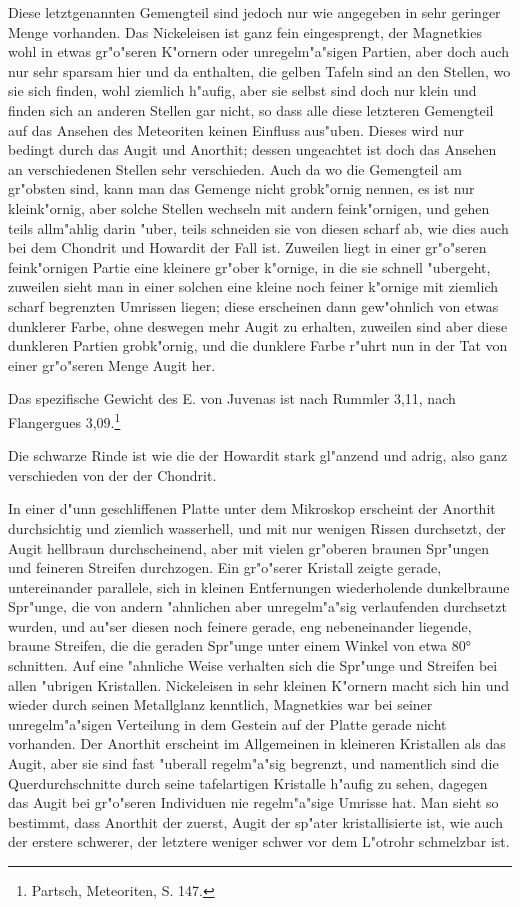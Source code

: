 \documentclass[a4paper, 11pt, oneside, german]{article}
\begin{document}
Diese letztgenannten Gemengteil sind jedoch nur wie angegeben in sehr geringer Menge vorhanden. Das Nickeleisen ist ganz fein eingesprengt, der Magnetkies wohl in etwas gr"o"seren K"ornern oder unregelm"a"sigen Partien, aber doch auch nur sehr sparsam hier und da enthalten, die gelben Tafeln sind an den Stellen, wo sie sich finden, wohl ziemlich h"aufig, aber sie selbst sind doch nur klein und finden sich an anderen Stellen gar nicht, so dass alle diese letzteren Gemengteil auf das Ansehen des Meteoriten keinen Einfluss aus"uben. Dieses wird nur bedingt durch das Augit und Anorthit; dessen ungeachtet ist doch das Ansehen an verschiedenen Stellen sehr verschieden. Auch da wo die Gemengteil am gr"obsten sind, kann man das Gemenge nicht grobk"ornig nennen, es ist nur kleink"ornig, aber solche Stellen wechseln mit andern feink"ornigen, und gehen teils allm"ahlig darin "uber, teils schneiden sie von diesen scharf ab, wie dies auch bei dem Chondrit und Howardit der Fall ist. Zuweilen liegt in einer gr"o"seren feink"ornigen Partie eine kleinere gr"ober k"ornige, in die sie schnell "ubergeht, zuweilen sieht man in einer solchen eine kleine noch feiner k"ornige mit ziemlich scharf begrenzten Umrissen liegen; diese erscheinen dann gew"ohnlich von etwas dunklerer Farbe, ohne deswegen mehr Augit zu erhalten, zuweilen sind aber diese dunkleren Partien grobk"ornig, und die dunklere Farbe r"uhrt nun in der Tat von einer gr"o"seren Menge Augit her.

Das spezifische Gewicht des E. von Juvenas ist nach Rummler 3,11, nach Flangergues 3,09.\footnote{Partsch, Meteoriten, S. 147.}

Die schwarze Rinde ist wie die der Howardit stark gl"anzend und adrig, also ganz verschieden von der der Chondrit.

In einer d"unn geschliffenen Platte unter dem Mikroskop erscheint der Anorthit durchsichtig und ziemlich wasserhell, und mit nur wenigen Rissen durchsetzt, der Augit hellbraun durchscheinend, aber mit vielen gr"oberen braunen Spr"ungen und feineren Streifen durchzogen. Ein gr"o"serer Kristall zeigte gerade, untereinander parallele, sich in kleinen Entfernungen wiederholende dunkelbraune Spr"unge, die von andern "ahnlichen aber unregelm"a"sig verlaufenden durchsetzt wurden, und au"ser diesen noch feinere gerade, eng nebeneinander liegende, braune Streifen, die die geraden Spr"unge unter einem Winkel von etwa 80° schnitten. Auf eine "ahnliche Weise verhalten sich die Spr"unge und Streifen bei allen "ubrigen Kristallen. Nickeleisen in sehr kleinen K"ornern macht sich hin und wieder durch seinen Metallglanz kenntlich, Magnetkies war bei seiner unregelm"a"sigen Verteilung in dem Gestein auf der Platte gerade nicht vorhanden. Der Anorthit erscheint im Allgemeinen in kleineren Kristallen als das Augit, aber sie sind fast "uberall regelm"a"sig begrenzt, und namentlich sind die Querdurchschnitte durch seine tafelartigen Kristalle h"aufig zu sehen, dagegen das Augit bei gr"o"seren Individuen nie regelm"a"sige Umrisse hat. Man sieht so bestimmt, dass Anorthit der zuerst, Augit der sp"ater kristallisierte ist, wie auch der erstere schwerer, der letztere weniger schwer vor dem L"otrohr schmelzbar ist.
\end{document}
